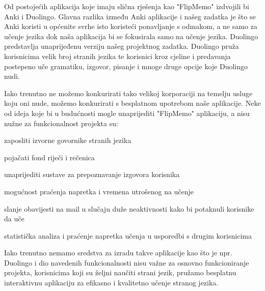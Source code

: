 Od postojećih aplikacija koje imaju slična rješenja kao "FlipMemo" izdvojili bi Anki i Duolingo. Glavna razlika između Anki aplikacije i našeg zadatka je što se Anki koristi u općenite svrhe isto koristeći ponavljanje s odmakom, a ne samo za učenje jezika dok naša aplikacija bi se fokusirala samo na učenje jezika. Duolingo predstavlja unaprijeđenu verziju našeg projektnog zadatka. Duolingo pruža korisnicima velik broj stranih jezika te korisnici kroz cjeline i predavanja postepeno uče gramatiku, izgovor, pisanje i mnoge druge opcije koje Duolingo nudi. 

Iako trenutno ne možemo konkurirati tako velikoj korporaciji na temelju usluge koju oni nude, možemo konkurirati s besplatnom upotrebom naše aplikacije. Neke od ideja koje bi u budućnosti mogle unaprijediti "FlipMemo" aplikaciju, a nisu nužne za funkcionalnost projekta su:

\begin{packed_item}
	\item  zaposliti izvorne govornike stranih jezika 
	\item  pojačati fond riječi i rečenica
	\item  unaprijediti sustave za prepoznavanje izgovora korisnika
	\item  mogućnost praćenja napretka i vremena utrošenog na učenje 
	\item  slanje obavijesti na mail u slučaju duže neaktivnosti kako bi potaknuli korisnike da uče
	\item  statistička analiza i praćenje napretka učenja u usporedbi s drugim korisnicima 
\end{packed_item}

Iako trenutno nemamo sredstva za izradu takve aplikacije kao što je npr. Duolingo i dio navedenih funkcionalnosti nisu važne za osnovno funkcioniranje projekta, korisnicima koji su željni naučiti strani jezik, pružamo besplatnu interaktivnu aplikaciju za efikasno i kvalitetno učenje stranog jezika.

	